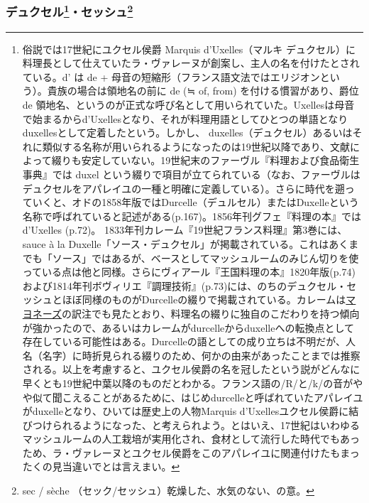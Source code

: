 \begin{recette}
{\subsubsection[デュクセル・セッシュ]{\texorpdfstring{デュクセル\footnote{俗説では17世紀にユクセル侯爵
  Marquis d'Uxelles（マルキ
  デュクセル）に料理長として仕えていたラ・ヴァレーヌが創案し、主人の名を付けたとされている。d'
  は de +
  母音の短縮形（フランス語文法ではエリジオンという）。貴族の場合は領地名の前に
  de (≒ of, from) を付ける慣習があり、爵位 de
  領地名、というのが正式な呼び名として用いられていた。Uxellesは母音で始まるからd'Uxellesとなり、それが料理用語としてひとつの単語となりduxellesとして定着したという。しかし、
  duxelles（デュクセル）あるいはそれに類似する名称が用いられるようになったのは19世紀以降であり、文献によって綴りも安定していない。19世紀末のファーヴル『料理および食品衛生事典』では
  duxel
  という綴りで項目が立てられている（なお、ファーヴルはデュクセルをアパレイユの一種と明確に定義している）。さらに時代を遡っていくと、オドの1858年版ではDurcelle（デュルセル）またはDuxelleという名称で呼ばれていると記述がある(p.167)。1856年刊グフェ『料理の本』ではd'Uxelles
  (p.72)。 1833年刊カレーム『19世紀フランス料理』第3巻には、sauce à la
  Duxelle「ソース・デュクセル」が掲載されている。これはあくまでも「ソース」ではあるが、ベースとしてマッシュルームのみじん切りを使っている点は他と同様。さらにヴィアール『王国料理の本』1820年版(p.74)
  および1814年刊ボヴィリエ『調理技術』(p.73)には、のちのデュクセル・セッシュとほぼ同様のものがDurcelleの綴りで掲載されている。カレームは\protect\hyperlink{mayonnaise}{マヨネーズ}の訳注でも見たとおり、料理名の綴りに独自のこだわりを持つ傾向が強かったので、あるいはカレームがdurcelleからduxelleへの転換点として存在している可能性はある。Durcelleの語としての成り立ちは不明だが、人名（名字）に時折見られる綴りのため、何かの由来があったことまでは推察される。以上を考慮すると、ユクセル侯爵の名を冠したという説がどんなに早くとも19世紀中葉以降のものだとわかる。フランス語の/R/と/k/の音がやや似て聞こえることがあるために、はじめdurcelleと呼ばれていたアパレイユがduxelleとなり、ひいては歴史上の人物Marquis
  d'Uxellesユクセル侯爵に結びつけられるようになった、と考えられよう。とはいえ、17世紀はいわゆるマッシュルームの人工栽培が実用化され、食材として流行した時代でもあっため、ラ・ヴァレーヌとユクセル侯爵をこのアパレイユに関連付けたもまったくの見当違いでとは言えまい。}・セッシュ\footnote{sec
  / sèche （セック/セッシュ）乾燥した、水気のない、の意。}}{デュクセル・セッシュ}}\label{duxelles-seche}}



\end{recette}
